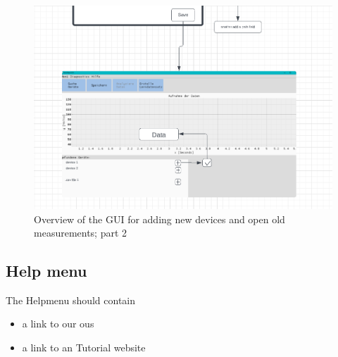 \documentclass{scrreprt}
\begin{document}
\begin{figure}
    \includegraphics[width=.9\textwidth]{./assets/pictures/Open2.png}
    \caption[]{Overview of the GUI for adding new devices and open old measurements; part 2}
    \label{fig:imgopen2}
\end{figure}


\subsection{Help menu}

The Helpmenu should contain 
\begin{itemize}
    \item a link to our ous
    \item a link to an Tutorial website
\end{itemize}







\printglossaries
\end{document}
